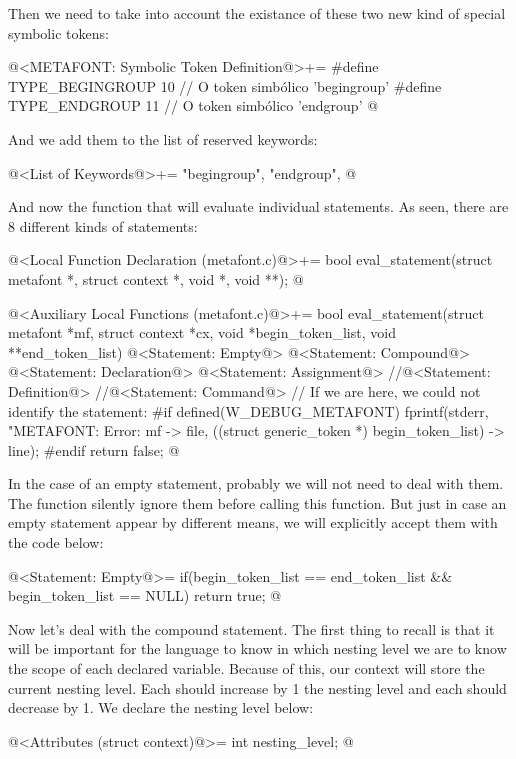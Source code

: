 Then we need to take into account the existance of these two new kind
of special symbolic tokens:

\iniciocodigo
@<METAFONT: Symbolic Token Definition@>+=
#define TYPE_BEGINGROUP            10 // O token simbólico 'begingroup'
#define TYPE_ENDGROUP              11 // O token simbólico 'endgroup'
@
\fimcodigo

And we add them to the list of reserved keywords:

\iniciocodigo
@<List of Keywords@>+=
"begingroup", "endgroup",
@
\fimcodigo

And now the function that will evaluate individual statements. As
seen, there are 8 different kinds of statements:

\iniciocodigo
@<Local Function Declaration (metafont.c)@>+=
bool eval_statement(struct metafont *, struct context *, void *, void **);
@
\fimcodigo


\iniciocodigo
@<Auxiliary Local Functions (metafont.c)@>+=
bool eval_statement(struct metafont *mf, struct context *cx,
                     void *begin_token_list, void **end_token_list){
  @<Statement: Empty@>
  @<Statement: Compound@>
  @<Statement: Declaration@>
  @<Statement: Assignment@>
  //@<Statement: Definition@>
  //@<Statement: Command@>
  // If we are here, we could not identify the statement:
#if defined(W_DEBUG_METAFONT)
    fprintf(stderr, "METAFONT: Error: %
            mf -> file,
            ((struct generic_token *) begin_token_list) -> line);
#endif
  return false;
}
@
\fimcodigo

In the case of an empty statement, probably we will not need to deal
with them. The function 
silently ignore them before calling this function. But just in case an
empty statement appear by different means, we will explicitly accept
them with the code below:

\iniciocodigo
@<Statement: Empty@>=
if(begin_token_list == end_token_list && begin_token_list == NULL)
  return true;
@
\fimcodigo

Now let's deal with the compound statement. The first thing to recall
is that it will be important for the language to know in which nesting
level we are to know the scope of each declared variable. Because of
this, our context will store the current nesting
level. Each  should increase by 1 the nesting
level and each  should decrease by 1. We declare
the nesting level below:

\iniciocodigo
@<Attributes (struct context)@>=
  int nesting_level;
@
\fimcodigo

